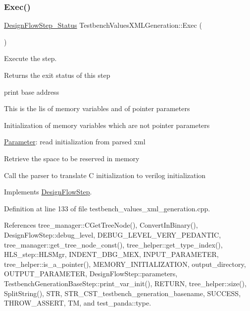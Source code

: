\mbox{\label{classTestbenchValuesXMLGeneration_afbcc1f49fabb5fa9cf4c4aaa15acba75}} 
\subsubsection{\texorpdfstring{Exec()}{Exec()}}
{\footnotesize\ttfamily \hyperlink{design__flow__step_8hpp_afb1f0d73069c26076b8d31dbc8ebecdf}{Design\+Flow\+Step\+\_\+\+Status} Testbench\+Values\+X\+M\+L\+Generation\+::\+Exec (\begin{DoxyParamCaption}{ }\end{DoxyParamCaption})\hspace{0.3cm}{\ttfamily [virtual]}}



Execute the step. 

\begin{DoxyReturn}{Returns}
the exit status of this step 
\end{DoxyReturn}
print base address

This is the lis of memory variables and of pointer parameters

Initialization of memory variables which are not pointer parameters

\hyperlink{classParameter}{Parameter}\+: read initialization from parsed xml

Retrieve the space to be reserved in memory

Call the parser to translate C initialization to verilog initialization 

Implements \hyperlink{classDesignFlowStep_a77d7e38493016766098711ea24f60b89}{Design\+Flow\+Step}.



Definition at line 133 of file testbench\+\_\+values\+\_\+xml\+\_\+generation.\+cpp.



References tree\+\_\+manager\+::\+C\+Get\+Tree\+Node(), Convert\+In\+Binary(), Design\+Flow\+Step\+::debug\+\_\+level, D\+E\+B\+U\+G\+\_\+\+L\+E\+V\+E\+L\+\_\+\+V\+E\+R\+Y\+\_\+\+P\+E\+D\+A\+N\+T\+IC, tree\+\_\+manager\+::get\+\_\+tree\+\_\+node\+\_\+const(), tree\+\_\+helper\+::get\+\_\+type\+\_\+index(), H\+L\+S\+\_\+step\+::\+H\+L\+S\+Mgr, I\+N\+D\+E\+N\+T\+\_\+\+D\+B\+G\+\_\+\+M\+EX, I\+N\+P\+U\+T\+\_\+\+P\+A\+R\+A\+M\+E\+T\+ER, tree\+\_\+helper\+::is\+\_\+a\+\_\+pointer(), M\+E\+M\+O\+R\+Y\+\_\+\+I\+N\+I\+T\+I\+A\+L\+I\+Z\+A\+T\+I\+ON, output\+\_\+directory, O\+U\+T\+P\+U\+T\+\_\+\+P\+A\+R\+A\+M\+E\+T\+ER, Design\+Flow\+Step\+::parameters, Testbench\+Generation\+Base\+Step\+::print\+\_\+var\+\_\+init(), R\+E\+T\+U\+RN, tree\+\_\+helper\+::size(), Split\+String(), S\+TR, S\+T\+R\+\_\+\+C\+S\+T\+\_\+testbench\+\_\+generation\+\_\+basename, S\+U\+C\+C\+E\+SS, T\+H\+R\+O\+W\+\_\+\+A\+S\+S\+E\+RT, TM, and test\+\_\+panda\+::type.

